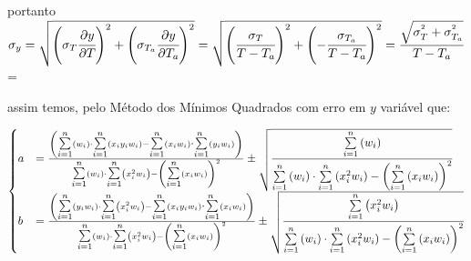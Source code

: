 \documentclass[a4paper]{article}
\begin{document}
	    
	    	portanto $\sigma_{y}=\sqrt{\left(\sigma_{T}\cfrac{\partial y}{\partial T}\right)^{2}+\left(\sigma_{T_{a}}\cfrac{\partial y}{\partial T_{a}}\right)^{2}}=\sqrt{\left(\cfrac{\sigma_{T}}{T-T_{a}}\right)^{2}+\left(-\cfrac{\sigma_{T_{a}}}{T-T_{a}}\right)^{2}}=\cfrac{\sqrt{\sigma_{T}^{^{2}}+\sigma_{T_{a}}^{^{2}}}}{T-T_{a}}$=
	    
	    	assim temos, pelo Método dos Mínimos Quadrados com erro em $y$ variável
	    	que:
	    
	    	\[
	    	\begin{cases}
	    		a & =\frac{\left({\displaystyle {\scriptscriptstyle {\textstyle \overset{n}{\underset{i=1}{\sum}}}}}\left(w_{i}\right)\cdot{\displaystyle {\scriptscriptstyle {\textstyle \overset{n}{\underset{i=1}{\sum}}}}}\left(x_{i}y_{i}w_{i}\right)-{\displaystyle {\scriptscriptstyle {\textstyle \overset{n}{\underset{i=1}{\sum}}}}}\left(x_{i}w_{i}\right){\scriptscriptstyle {\textstyle \overset{n}{\cdot\underset{i=1}{\sum}}}}\left(y_{i}w_{i}\right)\right)}{{\displaystyle {\scriptscriptstyle {\textstyle \overset{n}{\underset{i=1}{\sum}}}}}\left(w_{i}\right)\cdot{\displaystyle {\scriptscriptstyle {\textstyle \overset{n}{\underset{i=1}{\sum}}}}}\left(x_{i}^{2}w_{i}\right)-\left({\displaystyle {\scriptscriptstyle {\textstyle \overset{n}{\underset{i=1}{\sum}}}}}\left(x_{i}w_{i}\right)\right)^{2}}\pm\sqrt{\cfrac{{\displaystyle {\scriptscriptstyle {\textstyle \overset{n}{\underset{i=1}{\sum}}}}}\left(w_{i}\right)}{{\displaystyle {\scriptscriptstyle {\textstyle \overset{n}{\underset{i=1}{\sum}}}}}\left(w_{i}\right)\cdot{\displaystyle {\scriptscriptstyle {\textstyle \overset{n}{\underset{i=1}{\sum}}}}}\left(x_{i}^{2}w_{i}\right)-\left({\displaystyle {\scriptscriptstyle {\textstyle \overset{n}{\underset{i=1}{\sum}}}}}\left(x_{i}w_{i}\right)\right)^{2}}}\\
	    		b & =\frac{\left({\displaystyle {\scriptscriptstyle {\textstyle \overset{n}{\underset{i=1}{\sum}}}}}\left(y_{i}w_{i}\right)\cdot{\displaystyle {\scriptscriptstyle {\textstyle \overset{n}{\underset{i=1}{\sum}}}}}\left(x_{i}^{2}w_{i}\right)-{\displaystyle {\scriptscriptstyle {\textstyle \overset{n}{\underset{i=1}{\sum}}}}}\left(x_{i}y_{i}w_{i}\right){\scriptscriptstyle {\textstyle \overset{n}{\cdot\underset{i=1}{\sum}}}}\left(x_{i}w_{i}\right)\right)}{{\displaystyle {\scriptscriptstyle {\textstyle \overset{n}{\underset{i=1}{\sum}}}}}\left(w_{i}\right)\cdot{\displaystyle {\scriptscriptstyle {\textstyle \overset{n}{\underset{i=1}{\sum}}}}}\left(x_{i}^{2}w_{i}\right)-\left({\displaystyle {\scriptscriptstyle {\textstyle \overset{n}{\underset{i=1}{\sum}}}}}\left(x_{i}w_{i}\right)\right)^{2}}\pm\sqrt{\cfrac{{\displaystyle {\scriptscriptstyle {\textstyle \overset{n}{\underset{i=1}{\sum}}}}}\left(x_{i}^{2}w_{i}\right)}{{\displaystyle {\scriptscriptstyle {\textstyle \overset{n}{\underset{i=1}{\sum}}}}}\left(w_{i}\right)\cdot{\displaystyle {\scriptscriptstyle {\textstyle \overset{n}{\underset{i=1}{\sum}}}}}\left(x_{i}^{2}w_{i}\right)-\left({\displaystyle {\scriptscriptstyle {\textstyle \overset{n}{\underset{i=1}{\sum}}}}}\left(x_{i}w_{i}\right)\right)^{2}}}
	    	\end{cases}
	    	\]
	    
\end{document}
